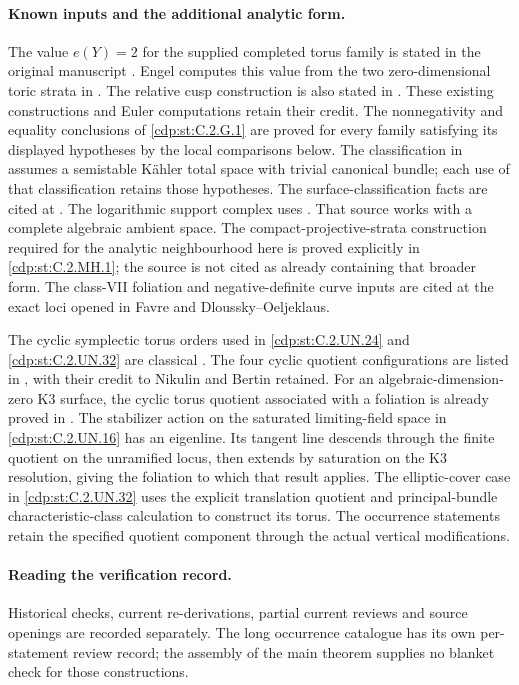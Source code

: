 \paragraph{Known inputs and the additional analytic form.}
The value $e(Y)=2$ for the supplied completed torus family
is stated in the original manuscript
\cite[Theorem on p.~4; Theorem~7.22, p.~60]{AC26}.
Engel computes this value from the two zero-dimensional
toric strata in \cite[Proposition~7.1]{Engel2026}.
The relative cusp construction is also stated in
\cite[Section~2, relative cusp theorem]{DGKX2026v1,DGKX2026v2}.
These existing constructions and Euler computations retain
their credit.  The nonnegativity and equality conclusions
of \ref{cdp:st:C.2.G.1} are proved for every family satisfying
its displayed hypotheses by the local comparisons below.
The classification in
\cite[Section~1 and Theorem~3.1]{KamenovaTori} assumes
a semistable K\"ahler total space with trivial canonical
bundle; each use of that classification retains those
hypotheses.
The surface-classification facts are cited at
\cite[Proposition~2.1 and Theorem~2.2, pp.~842--843]{Peters2021}.
The logarithmic support complex uses
\cite[Section~3, Theorem~1 and Corollary~2; Section~4, equation~(3)]{Steenbrink1999}.
That source works with a complete algebraic ambient space.
The compact-projective-strata construction required for the
analytic neighbourhood here is proved explicitly in
\ref{cdp:st:C.2.MH.1}; the source is not cited as already
containing that broader form. The class-VII foliation and
negative-definite curve inputs are cited at the exact loci
opened in Favre and Dloussky--Oeljeklaus.

The cyclic symplectic torus orders used in
\ref{cdp:st:C.2.UN.24} and \ref{cdp:st:C.2.UN.32}
are classical \cite[Lemmas~3.2--3.3, pp.~30--31]{Fujiki1988Tori}.
The four cyclic quotient configurations are listed in
\cite[table on p.~7659; Theorem~27, p.~7663]{Roulleau2019Kummer},
with their credit to Nikulin and Bertin retained.
For an algebraic-dimension-zero K3 surface, the cyclic
torus quotient associated with a foliation is already proved in
\cite[Section~10, pp.~29--30]{Brunella2002Foliations}.
The stabilizer action on the saturated limiting-field space
in \ref{cdp:st:C.2.UN.16} has an eigenline.  Its tangent line
descends through the finite quotient on the unramified locus,
then extends by saturation on the K3 resolution, giving the
foliation to which that result applies.  The elliptic-cover
case in \ref{cdp:st:C.2.UN.32} uses the explicit translation
quotient and principal-bundle characteristic-class calculation
to construct its torus.  The occurrence statements retain the
specified quotient component through the actual vertical
modifications.

\paragraph{Reading the verification record.}
Historical checks, current re-derivations, partial current
reviews and source openings are recorded separately. The long
occurrence catalogue has its own per-statement review record;
the assembly of the main theorem supplies no blanket check for
those constructions.
